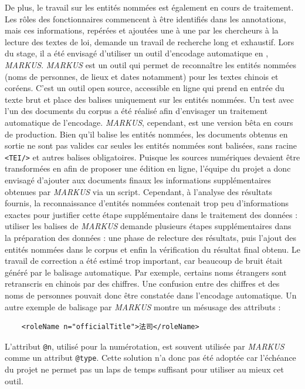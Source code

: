 De plus, le travail sur les entités nommées est également en cours de traitement. Les rôles des fonctionnaires commencent à être identifiés dans les annotations, mais ces informations, repérées et ajoutées une à une par les chercheurs à la lecture des textes de loi, demande un travail de recherche long et exhaustif. Lors du stage, il a été envisagé d'utiliser un outil d'encodage automatique en \TEI, \textit{MARKUS}. \textit{MARKUS} est un outil qui permet de reconnaître les entités nommées (noms de personnes, de lieux et dates notamment) pour les textes chinois et coréens. C'est un outil open source, accessible en ligne qui prend en entrée du texte brut et place des balises \TEI uniquement sur les entités nommées. Un test avec l'un des documents du corpus a été réalisé afin d'envisager un traitement automatique de l'encodage. \textit{MARKUS}, cependant, est une version bêta en cours de production. Bien qu'il balise les entités nommées, les documents \TEI obtenus en sortie ne sont pas valides car seules les entités nommées sont balisées, sans racine \texttt{<TEI/>} et autres balises obligatoires. Puisque les sources numériques devaient être transformées en \TEI afin de proposer une édition en ligne, l'équipe du projet a donc envisagé d'ajouter aux documents \TEI finaux les informations supplémentaires obtenues par \textit{MARKUS} via un script. Cependant, à l'analyse des résultats fournis, la reconnaissance d'entités nommées contenait trop peu d'informations exactes pour justifier cette étape supplémentaire dans le traitement des données : utiliser les balises de \textit{MARKUS} demande plusieurs étapes supplémentaires dans la préparation des données : une phase de relecture des résultats, puis l'ajout des entités nommées dans le corpus \TEI et enfin la vérification du résultat final obtenu. Le travail de correction a été estimé trop important, car beaucoup de bruit était généré par le balisage automatique. Par exemple, certains noms étrangers sont retranscris en chinois par des chiffres. Une confusion entre des chiffres et des noms de personnes pouvait donc être constatée dans l'encodage automatique. Un autre exemple de balisage par \textit{MARKUS} montre un mésusage des attributs \TEI : 

\begin{verbatim}
    <roleName n="officialTitle">法司</roleName>
\end{verbatim}

L'attribut \texttt{@n}, utilisé pour la numérotation, est souvent utilisée par \textit{MARKUS} comme un attribut \texttt{@type}. Cette solution n'a donc pas été adoptée car l'échéance du projet ne permet pas un laps de temps suffisant pour utiliser au mieux cet outil. 

